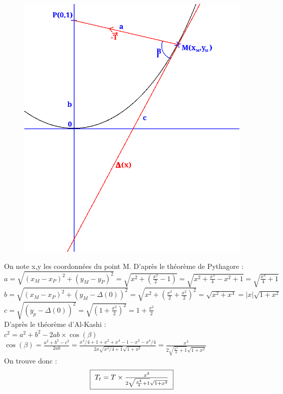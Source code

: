 \documentclass[10pt,a4paper]{article}
\begin{document}
\begin{figure}[H]
	\includegraphics[scale=0.5]{al-kashi.png}
\end{figure}
On note x,y les coordonnées du point M. D'après le théorème de Pythagore :\\
$a=\sqrt{(x_M-x_P)^2+(y_M-y_P)^2}=\sqrt{x^2+(\frac{x^2}{2}-1)}=\sqrt{x^2+\frac{x^4}{4}-x^2+1}=\sqrt{\frac{x^4}{4}+1}$\\
$b=\sqrt{(x_M-x_P)^2+(y_M-\Delta(0))^2}=\sqrt{x^2+(\frac{x^2}{2}+\frac{x^2}{2})^2}=\sqrt{x^2+x^4}=|x|\sqrt{1+x^2}$\\
$c=\sqrt{(y_p-\Delta(0))^2}=\sqrt{(1+\frac{x^2}{2})^2}=1+\frac{x^2}{2}$\\
D'après le théorème d'Al-Kashi : \\
$c^2 = a^2 + b^2 - 2ab\times\cos(\beta)$\\
$\cos(\beta)=\frac{a^2+b^2-c^2}{2ab}=\frac{x^4/4+1+x^2+x^4-1-x^2-x^4/4}{2x\sqrt{x^4/4+1}\sqrt{1+x^2}}=\frac{x^3}{2\sqrt{\frac{x^4}{4}+1}\sqrt{1+x^2}}$\\
On trouve donc :
\[\fbox{ $T_t=T\times\frac{x^3}{2\sqrt{\frac{x^4}{4}+1}\sqrt{1+x^2}}$ }\]\\
\end{document}
